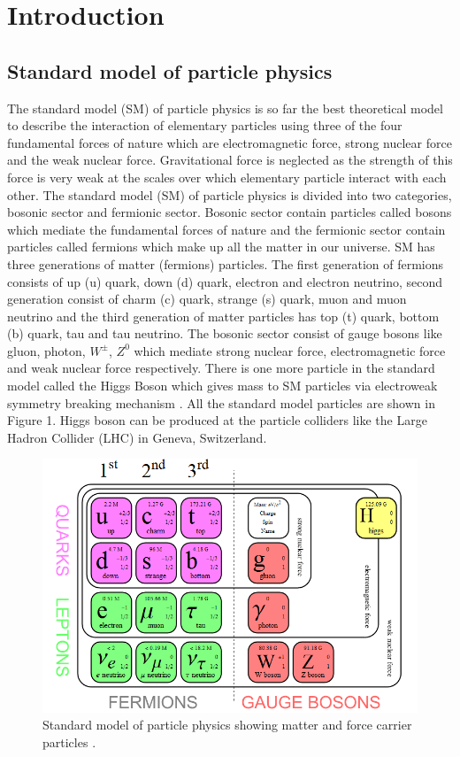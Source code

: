 \section{Introduction}
\label{sec:intro}

\subsection{Standard model of particle physics}
\onehalfspacing The standard model (SM) of particle physics is so far the best theoretical model to describe the interaction of elementary 
particles using three of the four fundamental forces of nature which are electromagnetic force, strong nuclear force and the weak nuclear force. Gravitational force is neglected as the strength of this force is very weak at the scales over which elementary particle interact with each other. The standard model (SM) of particle physics is divided into two categories, bosonic sector and fermionic sector. Bosonic sector contain particles called bosons which mediate the fundamental forces of nature and the fermionic sector contain particles called fermions which make up all the matter in our universe. SM has three generations of matter (fermions) particles. The first generation of fermions consists of up (u) quark, down (d) quark, electron and electron neutrino, second generation consist of charm (c) quark, strange (s) quark, muon and muon neutrino and the third generation of matter particles has top (t) quark, bottom (b) quark, tau and tau neutrino. The bosonic sector consist of gauge bosons like gluon, photon, $W^{\pm}$, $Z^0$ which mediate strong nuclear force, electromagnetic force and weak nuclear force respectively. There is one more particle in the standard model called the Higgs Boson which gives mass to SM particles via electroweak symmetry breaking mechanism \cite{Chatrchyan:2012xdj}. All the standard model particles are shown in Figure 1. Higgs boson can be produced at the particle colliders like the Large Hadron Collider (LHC) in Geneva, Switzerland. \\

\begin{figure}[H]
  \centering
  \includegraphics[width=0.7\columnwidth]{./SM.png}
  \caption{\onehalfspacing Standard model of particle physics showing matter and force carrier particles \cite{smpp}.}
  \label{fig:LHC}
\end{figure}


